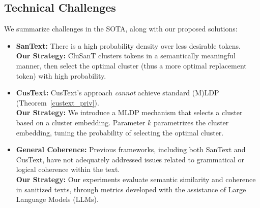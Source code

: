 \documentclass[11pt]{article}
\newcommand{\clusant}{CluSanT\xspace}
\begin{document}
\subsection{Technical Challenges}
We summarize challenges in the SOTA,  along with our proposed solutions:

\begin{itemize}
\setlength\itemsep{0em}
    \item \textbf{SanText:} %
    There is a high probability density over less desirable tokens. \\
    \textbf{Our Strategy:} \clusant  clusters tokens in a semantically meaningful manner, then select the optimal cluster (thus a more optimal replacement token) with high probability.  %

    \item \textbf{CusText:} 
    CusText's approach {\em cannot} achieve standard (M)LDP (Theorem~\ref{custext_priv}). \\
    \textbf{Our Strategy:} 
    We introduce a MLDP mechanism that selects a cluster based on a cluster embedding. %
    Parameter $k$ parametrizes the cluster embedding, tuning the probability of selecting the optimal cluster. %
    
    \item \textbf{General Coherence:} Previous frameworks, including both SanText and CusText, have not adequately addressed issues related to grammatical or logical coherence within the text. \\ \textbf{Our Strategy:} Our experiments evaluate semantic similarity and coherence in sanitized texts,  through metrics developed with the assistance of Large Language Models (LLMs). 
\end{itemize}
\end{document}
